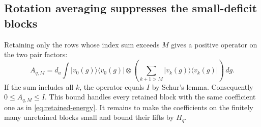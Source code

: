 \subsection{Rotation averaging suppresses the small-deficit blocks}

Retaining only the rows whose index sum exceeds $M$ gives a positive
operator on the two pair factors:
\begin{equation}\label{eq:pair-tail-average}
 A_{q,M}=d_a\int
 |v_0(g)\rangle\langle v_0(g)|\otimes
 \left(\sum_{k+1>M}|v_k(g)\rangle\langle v_k(g)|\right)\,dg.
\end{equation}
If the sum includes all $k$, the operator equals $I$ by Schur's lemma.
Consequently $0\le A_{q,M}\le I$.  This bound handles every retained
block with the same coefficient one as in \eqref{eq:retained-energy}.
It remains to make the coefficients on the finitely many unretained
blocks small and bound their lifts by $H_q$.

